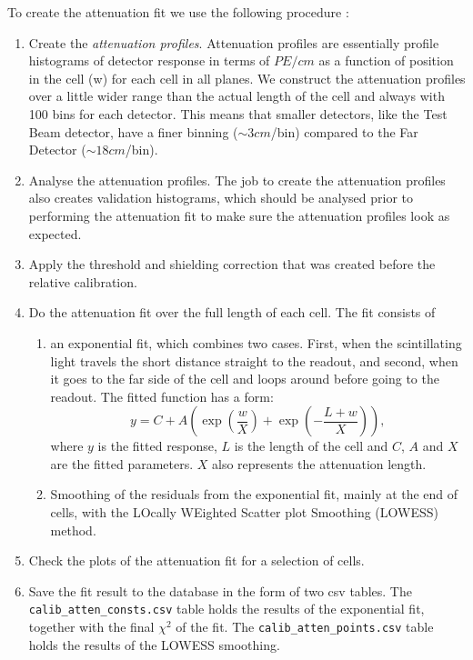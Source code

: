 To create the attenuation fit we use the following procedure \cite{NOVA-doc-7410}:
\begin{enumerate}
\item Create the \textit{attenuation profiles}. Attenuation profiles are essentially profile histograms of detector response in terms of $\unit{PE/cm}$ as a function of position in the cell (w) for each cell in all planes. We construct the attenuation profiles over a little wider range than the actual length of the cell and always with 100 bins for each detector. This means that smaller detectors, like the Test Beam detector, have a finer binning ($\sim 3\unit{cm}$/bin) compared to the Far Detector ($\sim 18\unit{cm}$/bin).
\item Analyse the attenuation profiles. The job to create the attenuation profiles also creates validation histograms, which should be analysed prior to performing the attenuation fit to make sure the attenuation profiles look as expected.
\item Apply the threshold and shielding correction that was created before the relative calibration.
\item Do the attenuation fit over the full length of each cell. The fit consists of
\begin{enumerate}
\item an exponential fit, which combines two cases. First, when the scintillating light travels the short distance straight to the readout, and second, when it goes to the far side of the cell and loops around before going to the readout. The fitted function has a form:\\
\begin{equation}
y=C+A\left(\exp\left(\frac{w}{X}\right)+\exp\left(-\frac{L+w}{X}\right)\right),
\end{equation}
where $y$ is the fitted response, $L$ is the length of the cell and $C$, $A$ and $X$ are the fitted parameters. $X$ also represents the attenuation length.
\item Smoothing of the residuals from the exponential fit, mainly at the end of cells, with the LOcally WEighted Scatter plot Smoothing (LOWESS) method.
\end{enumerate}
\item Check the plots of the attenuation fit for a selection of cells.
\item Save the fit result to the database in the form of two csv tables. The \texttt{calib\_atten\_consts.csv} table holds the results of the exponential fit, together with the final $\chi^2$ of the fit. The \texttt{calib\_atten\_points.csv} table holds the results of the LOWESS smoothing.
\end{enumerate}

